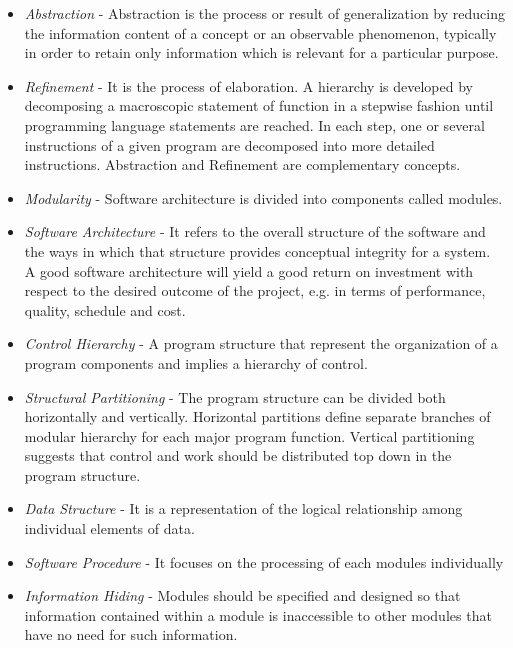 \begin{itemize}
\item \emph{Abstraction} - Abstraction is the process or result of generalization by reducing the information content of a concept or an observable phenomenon, typically in order to retain only information which is relevant for a particular purpose.
\item \emph{Refinement} - It is the process of elaboration. A hierarchy is developed by decomposing a macroscopic statement of function in a stepwise fashion until programming language statements are reached. In each step, one or several instructions of a given program are decomposed into more detailed instructions. Abstraction and Refinement are complementary concepts.
\item \emph{Modularity} - Software architecture is divided into components called modules.
\item \emph{Software Architecture} - It refers to the overall structure of the software and the ways in which that structure provides conceptual integrity for a system. A good software architecture will yield a good return on investment with respect to the desired outcome of the project, e.g. in terms of performance, quality, schedule and cost.
\item \emph{Control Hierarchy} - A program structure that represent the organization of a program components and implies a hierarchy of control.
\item \emph{Structural Partitioning} - The program structure can be divided both horizontally and vertically. Horizontal partitions define separate branches of modular hierarchy for each major program function. Vertical partitioning suggests that control and work should be distributed top down in the program structure.
\item \emph{Data Structure} - It is a representation of the logical relationship among individual elements of data.
\item \emph{Software Procedure} - It focuses on the processing of each modules individually
\item \emph{Information Hiding} - Modules should be specified and designed so that information contained within a module is inaccessible to other modules that have no need for such information.
\end{itemize}

